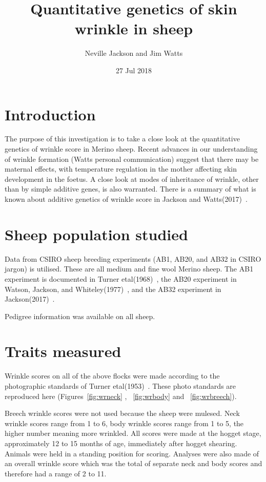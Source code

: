 \documentclass[titlepage]{article}  %
\title{ Quantitative genetics of skin wrinkle in sheep}
\author{Neville Jackson and Jim Watts }
\date{27 Jul 2018}
\begin{document}
 
 
\maketitle      
\tableofcontents


\clearpage
\section{Introduction} 
 The purpose of this investigation is to take a close look at the quantitative genetics of wrinkle score in Merino sheep.  Recent advances in our understanding of wrinkle formation (Watts personal communication) suggest that there may be maternal effects, with temperature regulation in the mother affecting skin development in the foetus. A close look at modes of inheritance  of wrinkle, other than by simple additive genes, is also warranted. There is a summary of what is known about additive genetics of wrinkle score in Jackson and Watts(2017)~\cite{jack:17a}.

\section{ Sheep population studied}
Data from CSIRO sheep breeding experiments (AB1, AB20, and AB32 in CSIRO jargon) is utilised.  These are all medium and fine wool Merino sheep. The AB1 experiment is documented in Turner etal(1968)~\cite{turn:68}, the AB20 experiment in Watson, Jackson, and Whiteley(1977)~\cite{wats:77}, and the AB32 experiment in Jackson(2017)~\cite{jack:17}.


Pedigree information was available on all sheep.

\section{Traits measured}
 Wrinkle scores on all of the above flocks were made according to the photographic standards of Turner etal(1953)~\cite{turn:53}. These photo standards are reproduced here (Figures~\ref{fig:wrneck} , ~\ref{fig:wrbody} and ~\ref{fig:wrbreech}). 



Breech wrinkle scores were not used because the sheep were mulesed. Neck wrinkle scores range from 1 to 6, body wrinkle scores range from 1 to 5, the higher number meaning more wrinkled.  All scores were made at the hogget stage, approximately 12 to 15 months of age, immediately after hogget shearing. Animals were held in a standing position for scoring.
Analyses were also made of an overall wrinkle score which was the total of separate neck and body scores and therefore had a range of 2 to 11. 
\end{document}

